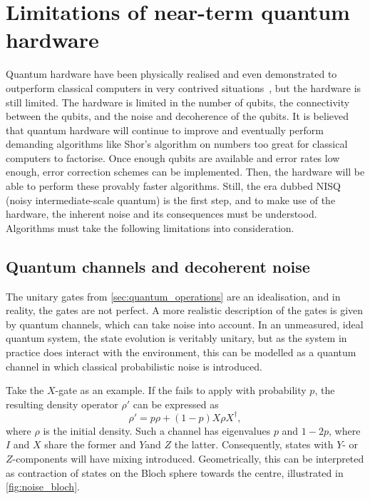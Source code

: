 \section{Limitations of near-term quantum hardware}
\label{sec:nisq}
Quantum hardware have been physically realised and even demonstrated to outperform classical computers in very contrived situations~\autocite{arute2019, zhong2020, madsen2022}, but the hardware is still limited.
The hardware is limited in the number of qubits, the connectivity between the qubits, and the noise and decoherence of the qubits.
It is believed that quantum hardware will continue to improve and eventually perform demanding algorithms like Shor's algorithm on numbers too great for classical computers to factorise.
Once enough qubits are available and error rates low enough, error correction schemes can be implemented.
Then, the hardware will be able to perform these provably faster algorithms.
Still, the era dubbed NISQ (noisy intermediate-scale quantum) is the first step, and to make use of the hardware, the inherent noise and its consequences must be understood.
Algorithms must take the following limitations into consideration.

\subsection{Quantum channels and decoherent noise}
The unitary gates from \cref{sec:quantum_operations} are an idealisation, and in reality, the gates are not perfect.
A more realistic description of the gates is given by quantum channels, which can take noise into account.
In an unmeasured, ideal quantum system, the state evolution is veritably unitary, but as the system in practice does interact with the environment, this can be modelled as a quantum channel in which classical probabilistic noise is introduced.

Take the $X$-gate as an example.
If the fails to apply with probability $p$, the resulting density operator $\rho'$ can be expressed as
\begin{equation}
    \rho' = p\rho + (1-p)X\rho X^\dagger,
\end{equation}
where $\rho$ is the initial density.
Such a channel has eigenvalues $p$ and $1-2p$, where $I$ and $X$ share the former and $Y$and $Z$ the latter.
Consequently, states with $Y$- or $Z$-components will have mixing introduced.
Geometrically, this can be interpreted as contraction of states on the Bloch sphere towards the centre, illustrated in \cref{fig:noise_bloch}.


